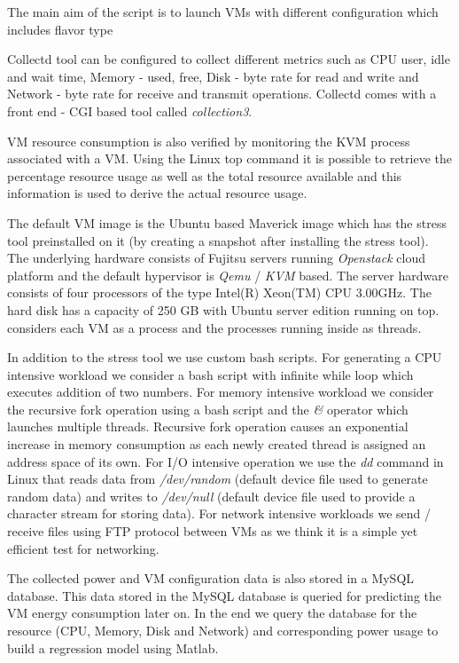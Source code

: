 \documentclass[singlecolumn,letterpaper,12pt]{article}
\begin{document}
The main aim of the script is to launch VMs with different configuration which includes flavor type 

Collectd tool can be configured to collect different metrics such as CPU user, idle and wait time, Memory - used, free, Disk - byte rate for read and write and Network - byte rate for receive and transmit operations. Collectd comes with a front end - CGI based tool called \emph{collection3}. 

VM resource consumption is also verified by monitoring the KVM process associated with a VM. Using the Linux top command it is possible to retrieve the percentage resource usage as well as the total resource available and this information is used to derive the actual resource usage.

The default VM image is the Ubuntu based Maverick image which has the stress tool preinstalled on it (by creating a snapshot after installing the stress tool). The underlying hardware consists of Fujitsu servers running \emph{Openstack} cloud platform and the default hypervisor is \emph{Qemu} / \emph{KVM} based. The server hardware consists of four processors of the type Intel(R) Xeon(TM) CPU 3.00GHz. The hard disk has a capacity of 250 GB with Ubuntu server edition running on top. \cite{vm-power-meter} considers each VM as a process and the processes running inside as threads.

In addition to the stress tool we use custom bash scripts. For generating a CPU intensive workload we consider a bash script with infinite while loop which executes addition of two numbers. For memory intensive workload we consider the recursive fork operation using a bash script and the \emph{\&} operator which launches multiple threads. Recursive fork operation causes an exponential increase in memory consumption as each newly created thread is assigned an address space of its own. For I/O intensive operation we use the \emph{dd} command in Linux that reads data from \emph{/dev/random} (default device file used to generate random data) and writes to \emph{/dev/null} (default device file used to provide a character stream for storing data). For network intensive workloads we send / receive files using FTP protocol between VMs as we think it is a simple yet efficient test for networking.

The collected power and VM configuration data is also stored in a MySQL database. This data stored in the MySQL database is queried for predicting the VM energy consumption later on. In the end we query the database for the resource (CPU, Memory, Disk and Network) and corresponding power usage to build a regression model using Matlab.
\end{document}
